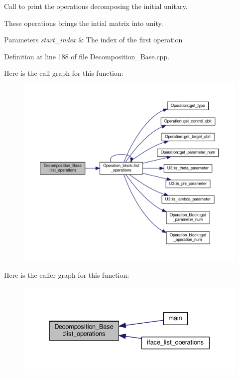 Call to print the operations decomposing the initial unitary. 

These operations brings the intial matrix into unity. 
\begin{DoxyParams}{Parameters}
{\em start\+\_\+index} & The index of the first operation \\
\hline
\end{DoxyParams}


Definition at line 188 of file Decomposition\+\_\+\+Base.\+cpp.



Here is the call graph for this function\+:
\nopagebreak
\begin{figure}[H]
\begin{center}
\leavevmode
\includegraphics[width=350pt]{class_decomposition___base_a4c6c81d70f49ee249aa455a4f2718ee2_cgraph}
\end{center}
\end{figure}




Here is the caller graph for this function\+:
\nopagebreak
\begin{figure}[H]
\begin{center}
\leavevmode
\includegraphics[width=331pt]{class_decomposition___base_a4c6c81d70f49ee249aa455a4f2718ee2_icgraph}
\end{center}
\end{figure}


